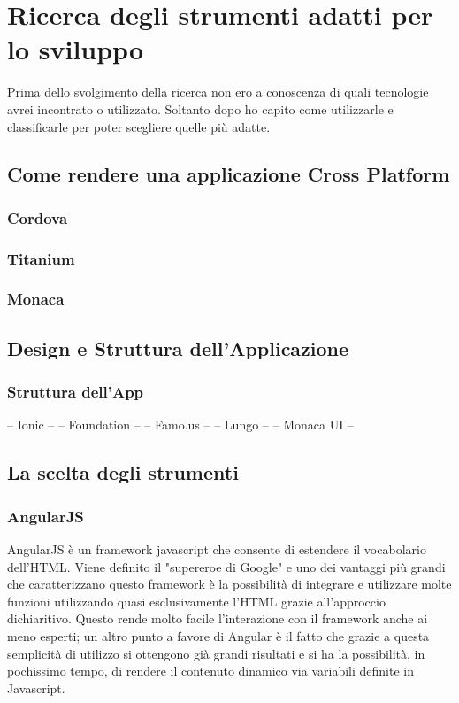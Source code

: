 \chapter{Ricerca degli strumenti adatti per lo sviluppo}
Prima dello svolgimento della ricerca non ero a conoscenza di quali tecnologie avrei incontrato o utilizzato. Soltanto dopo ho capito come utilizzarle e classificarle per poter scegliere quelle più adatte.
\section{Come rendere una applicazione Cross Platform}
\subsection{Cordova}
\subsection{Titanium}
\subsection{Monaca}
\section{Design e Struttura dell'Applicazione}
\subsection{Struttura dell'App}
-- Ionic --
-- Foundation --
-- Famo.us --
-- Lungo --
-- Monaca UI --
\section{La scelta degli strumenti}
\subsection{AngularJS}
AngularJS è un framework javascript che consente di estendere il vocabolario dell'HTML. Viene definito il "supereroe di Google" e uno dei vantaggi più grandi che caratterizzano questo framework è la possibilità di integrare e utilizzare molte funzioni utilizzando quasi esclusivamente l’HTML grazie all'approccio dichiaritivo. Questo rende molto facile l'interazione con il framework anche ai meno esperti; un altro punto a favore di Angular è il fatto che grazie a questa semplicità di utilizzo si ottengono già grandi risultati e si ha la possibilità, in pochissimo tempo, di rendere il contenuto dinamico via variabili definite in Javascript. 

